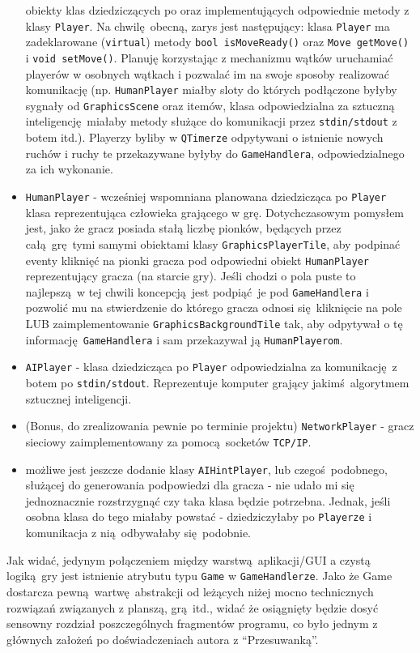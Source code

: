 \documentclass[a4paper,12pt]{article}
\begin{document}
\begin{itemize}
 obiekty klas dziedziczących po oraz implementujących odpowiednie metody z klasy \verb|Player|. Na chwilę obecną, zarys jest następujący: klasa
 \verb|Player| ma zadeklarowane (\verb|virtual|) metody \verb|bool isMoveReady()| oraz \verb|Move getMove()| i \verb|void setMove()|. 
 Planuję korzystając z mechanizmu wątków uruchamiać playerów w osobnych wątkach i pozwalać im na swoje sposoby realizować komunikację 
 (np. \verb|HumanPlayer| miałby sloty do których podłączone byłyby sygnały od \verb|GraphicsScene| oraz itemów, klasa odpowiedzialna za sztuczną
 inteligencję miałaby metody służące do komunikacji przez \verb|stdin/stdout| z botem itd.). Playerzy byliby w \verb|QTimerze| odpytywani o 
 istnienie nowych ruchów i ruchy te przekazywane byłyby do \verb|GameHandlera|, odpowiedzialnego za ich wykonanie.
 \item \verb|HumanPlayer| - wcześniej wspomniana planowana dziedzicząca po \verb|Player| klasa reprezentująca człowieka grającego w grę. 
 Dotychczasowym pomysłem jest, jako że gracz posiada stałą liczbę pionków, będących przez całą grę tymi samymi obiektami klasy 
 \verb|GraphicsPlayerTile|, aby podpinać eventy kliknięć na pionki gracza pod odpowiedni obiekt \verb|HumanPlayer| reprezentujący gracza 
 (na starcie gry). Jeśli chodzi o pola puste to najlepszą w tej chwili koncepcją jest podpiąć je pod \verb|GameHandlera| i pozwolić mu na 
 stwierdzenie do którego gracza odnosi się kliknięcie na pole LUB zaimplementowanie \verb|GraphicsBackgroundTile| tak, aby odpytywał o tę
 informację \verb|GameHandlera| i sam przekazywał ją \verb|HumanPlayerom|. 
 \item \verb|AIPlayer| - klasa dziedzicząca po \verb|Player| odpowiedzialna za komunikację z botem po \verb|stdin/stdout|. Reprezentuje komputer
 grający jakimś algorytmem sztucznej inteligencji.
 \item(Bonus, do zrealizowania pewnie po terminie projektu) \verb|NetworkPlayer| - gracz sieciowy zaimplementowany za pomocą socketów 
 \verb|TCP/IP|.
 \item możliwe jest jeszcze dodanie klasy \verb|AIHintPlayer|, lub czegoś podobnego, służącej do generowania podpowiedzi dla gracza - 
 nie udało mi się jednoznacznie rozstrzygnąć czy taka klasa będzie potrzebna. Jednak, jeśli osobna klasa do tego miałaby powstać - dziedziczyłaby
 po \verb|Playerze| i komunikacja z nią odbywałaby się podobnie.
\end{itemize}
Jak widać, jedynym połączeniem między warstwą aplikacji/GUI a czystą logiką gry jest istnienie atrybutu typu \verb|Game| w \verb|GameHandlerze|. 
Jako że Game dostarcza pewną wartwę abstrakcji od leżących niżej mocno technicznych rozwiązań związanych z planszą, grą itd., widać że osiągnięty 
będzie dosyć sensowny rozdział poszczególnych fragmentów programu, co było jednym z głównych założeń po doświadczeniach autora z ``Przesuwanką''.
\end{document}
